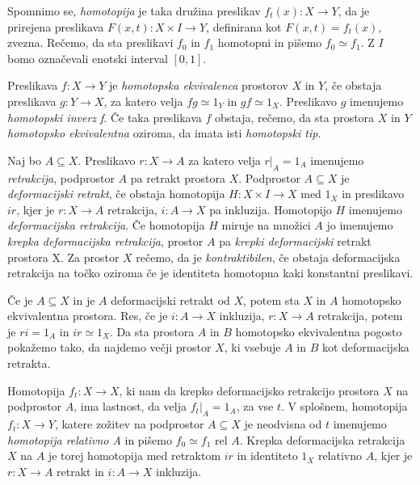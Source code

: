 \documentclass[mat1]{fmfdelo}
\begin{document}
Spomnimo se, \emph{homotopija} je taka družina preslikav $f_t(x)\colon X \rightarrow Y$, da je prirejena preslikava $F(x,t)\colon X \times I \rightarrow Y$, definirana kot $F(x,t)=f_t(x)$, zvezna. Rečemo, da sta preslikavi $f_0$ in $f_1$ homotopni in pišemo $f_0 \simeq f_1$. Z $I$ bomo označevali enotski interval $[0,1]$.


\begin{definicija}
    Preslikava  $f \colon  X \rightarrow Y$ je \emph{homotopska ekvivalenca} prostorov $X$ in $Y$, če obstaja preslikava $g\colon  Y\rightarrow X$, za katero velja $f g \simeq 1_Y$ in $gf \simeq 1_X$. Preslikavo $g$ imenujemo \emph{homotopski inverz f}. Če taka preslikava $f$ obstaja, rečemo, da sta prostora $X$ in
    $Y$  \emph{homotopsko ekvivalentna} oziroma, da imata isti \emph{homotopski tip}.
\end{definicija}

\begin{definicija}
    Naj bo $A \subseteq X$. Preslikavo $r \colon  X \rightarrow A$ za katero 
    velja $r|_A = 1_A$ imenujemo \emph{retrakcija}, podprostor
     $A$ pa retrakt prostora $X$. Podprostor $A \subseteq X$ je 
     \emph{deformacijski retrakt}, če obstaja homotopija $H \colon  X \times
      I \rightarrow X$ med $1_X$ in preslikavo $ir$, kjer je $r \colon  X 
      \rightarrow A$ retrakcija, $i\colon A\rightarrow X$ pa inkluzija. Homotopijo $H$ imenujemo \emph{deformacijska 
      retrakcija}. Če homotopija $H$ miruje na množici $A$ jo imenujemo 
      \emph{krepka deformacijska retrakcija}, prostor $A$ pa 
      \emph{krepki deformacijski} retrakt prostora X. Za prostor $X$ rečemo, da je \emph{kontraktibilen}, če obstaja deformacijska retrakcija na točko oziroma če je identiteta homotopna kaki konstantni preslikavi.
\end{definicija}

Če je $A\subseteq X$ in je $A$ deformacijski retrakt od $X$, potem sta 
$X$ in $A$ homotopsko ekvivalentna prostora. Res, če je $i\colon A\rightarrow
 X$ inkluzija, $r\colon X\rightarrow A$ retrakcija, potem je $ri=1_A$
  in $ir\simeq1_X$. Da sta prostora $A$ in $B$ homotopsko ekvivalentna pogosto pokažemo tako, da najdemo večji prostor
    $X$, ki vsebuje $A$ in $B$ kot deformacijska retrakta. 

Homotopija $f_t\colon  X\rightarrow X$, ki nam da krepko deformacijsko retrakcijo 
prostora $X$ na podprostor $A$, ima lastnost, da velja 
$f_t|_A=1_A$, za vse $t$. V splošnem, homotopija 
$f_t\colon X\rightarrow Y$, katere zožitev na podprostor $A\subseteq X$ je 
neodvisna od $t$ imenujemo \emph{homotopija relativno A} in pišemo $f_0 \simeq f_1$ rel $A$. Krepka 
deformacijska retrakcija $X$ na $A$ je torej homotopija med retraktom
 $ir$ in identiteto $1_X$ relativno $A$, kjer je $r\colon X\rightarrow A$ retrakt in $i\colon A\rightarrow X$ inkluzija.
\end{document}
